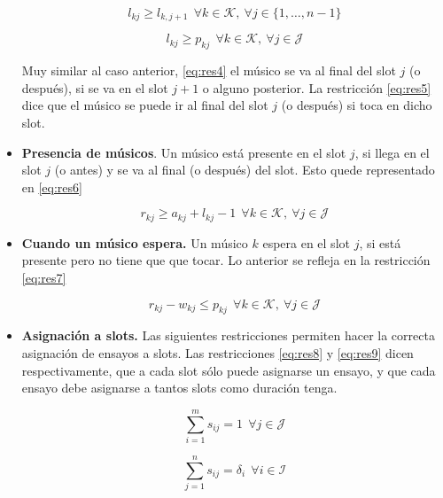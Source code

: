 \documentclass[journal, 10pt]{IEEEtran}
\begin{document}
\begin{itemize}
\begin{equation}\label{eq:res4} 
	l_{kj} \geq l_{k,j+1} \ \ \forall k \in \mathcal{K}, \ \forall j \in \{1,\ldots,n-1\}
\end{equation}

\begin{equation}\label{eq:res5} 
	l_{kj} \geq p_{kj} \ \ \forall k \in \mathcal{K},\ \forall j \in \mathcal{J}
\end{equation}

Muy similar al caso anterior, \eqref{eq:res4} el músico se va al final del slot $j$ (o después), si se va en el slot $j+1$ o alguno posterior. La restricción \eqref{eq:res5} dice que el músico se puede ir al final del slot $j$ (o después) si toca en dicho slot.     



\item \textbf{Presencia de músicos}. Un músico está presente en el slot $j$, si llega en el slot $j$ (o antes) y se va al final (o después) del slot. Esto quede representado en \eqref{eq:res6}

\begin{equation}\label{eq:res6} 
	r_{kj} \geq a_{kj} + l_{kj} - 1 \ \ \forall k \in \mathcal{K},\ \forall j \in \mathcal{J}
\end{equation}



\item \textbf{Cuando un músico espera.} Un músico $k$ espera en el slot $j$, si está presente pero no tiene que que tocar. Lo anterior se refleja en la restricción \eqref{eq:res7}

\begin{equation}\label{eq:res7} 
	r_{kj} - w_{kj} \leq p_{kj} \ \ \forall k \in \mathcal{K},\ \forall j \in \mathcal{J}
\end{equation}


\item \textbf{Asignación a slots.} Las siguientes restricciones permiten hacer la correcta asignación de ensayos a slots. Las restricciones \eqref{eq:res8} y \eqref{eq:res9} dicen respectivamente, que a cada slot sólo puede asignarse un ensayo, y que cada ensayo debe asignarse a tantos slots como duración tenga.    

\begin{equation}\label{eq:res8} 
	\sum_{i=1}^{m} s_{ij} = 1 \ \ \forall j \in \mathcal{J}
\end{equation}


\begin{equation}\label{eq:res9} 
	\sum_{j=1}^n s_{ij} = \delta_{i} \ \ \forall i \in \mathcal{I}
\end{equation}


\end{itemize}
\end{document}
